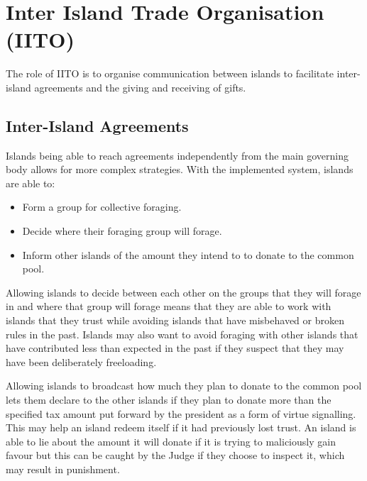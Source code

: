 \chapter{Inter Island Trade Organisation (IITO)}

The role of IITO is to organise communication between islands to facilitate inter-island agreements and the giving and receiving of gifts.  

\section{Inter-Island Agreements}  
\label{sec:IITO:inter_island_agreements}  


Islands being able to reach agreements independently from the main governing body allows for more complex strategies. With the implemented system, islands are able to:

\begin{itemize}
    \item Form a group for collective foraging.
    \item Decide where their foraging group will forage.
    \item Inform other islands of the amount they intend to to donate to the common pool.
\end{itemize}

Allowing islands to decide between each other on the groups that they will forage in and where that group will forage means that they are able to work with islands that they trust while avoiding islands that have misbehaved or broken rules in the past. Islands may also want to avoid foraging with other islands that have contributed less than expected in the past if they suspect that they may have been deliberately freeloading.

Allowing islands to broadcast how much they plan to donate to the common pool lets them declare to the other islands if they plan to donate more than the specified tax amount put forward by the president as a form of virtue signalling. This may help an island redeem itself if it had previously lost trust. An island is able to lie about the amount it will donate if it is trying to maliciously gain favour but this can be caught by the Judge if they choose to inspect it, which may result in punishment.

